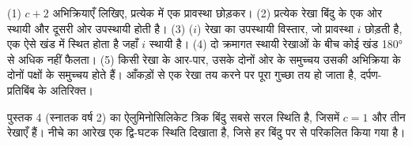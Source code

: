 \begin{method}[श्राइनमेकर्स के नियम]\label{met:b3:petrological-thermodynamics:schreinemakers}
(1) $c + 2$ अभिक्रियाएँ लिखिए, प्रत्येक में एक प्रावस्था छोड़कर। (2) प्रत्येक रेखा
बिंदु के एक ओर स्थायी और दूसरी ओर उपस्थायी होती है।
(3) ($i$) रेखा का उपस्थायी विस्तार, जो प्रावस्था $i$ छोड़ती है, एक ऐसे खंड में
स्थित होता है जहाँ $i$ स्थायी है। (4) दो क्रमागत स्थायी रेखाओं के बीच कोई खंड
\ang{180} से अधिक नहीं फैलता। (5) किसी रेखा के आर-पार, उसके दोनों ओर के समुच्चय
उसकी अभिक्रिया के दोनों पक्षों के समुच्चय होते हैं। आँकड़ों से एक रेखा तय करने पर
पूरा गुच्छा तय हो जाता है, दर्पण-प्रतिबिंब के अतिरिक्त।
\end{method}

पुस्तक 4 (स्नातक वर्ष 2) का ऐलुमिनोसिलिकेट त्रिक बिंदु सबसे सरल स्थिति है,
जिसमें $c = 1$ और तीन रेखाएँ हैं। नीचे का आरेख एक द्वि-घटक स्थिति दिखाता है, जिसे
हर बिंदु पर  से परिकलित किया गया है।


